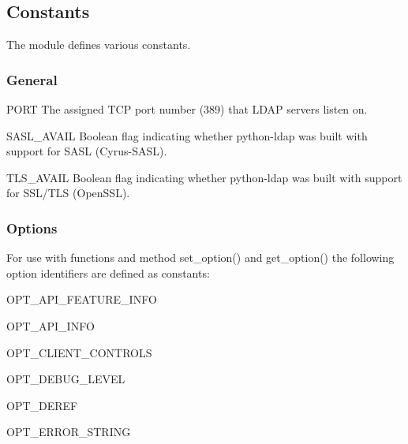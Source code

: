 \subsection{Constants}

The module defines various constants.

\subsubsection{General}

\begin{datadesc}{PORT}
  The assigned TCP port number (389) that LDAP servers listen on.
\end{datadesc}

\begin{datadesc}{SASL_AVAIL}
  Boolean flag indicating whether python-ldap was built
  with support for SASL (Cyrus-SASL).
\end{datadesc}

\begin{datadesc}{TLS_AVAIL}
  Boolean flag indicating whether python-ldap was built
  with support for SSL/TLS (OpenSSL).
\end{datadesc}

\subsubsection{Options}

For use with functions and method set_option() and get_option() the
following option identifiers are defined as constants:

\begin{datadesc}{OPT_API_FEATURE_INFO}
\end{datadesc}

\begin{datadesc}{OPT_API_INFO}
\end{datadesc}

\begin{datadesc}{OPT_CLIENT_CONTROLS}
\end{datadesc}

\begin{datadesc}{OPT_DEBUG_LEVEL}
\end{datadesc}

\begin{datadesc}{OPT_DEREF}
\end{datadesc}

\begin{datadesc}{OPT_ERROR_STRING}
\end{datadesc}

